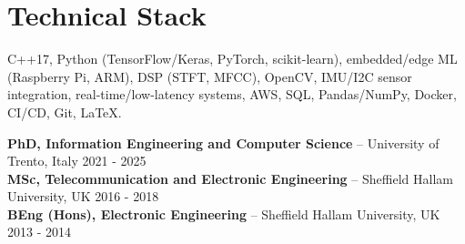 \documentclass[11pt]{article}
\begin{document}
\section*{Technical Stack}
C++17, Python (TensorFlow/Keras, PyTorch, scikit-learn), embedded/edge ML (Raspberry Pi, ARM), DSP (STFT, MFCC), OpenCV, IMU/I2C sensor integration, real-time/low-latency systems, AWS, SQL, Pandas/NumPy, Docker, CI/CD, Git, LaTeX.

\textbf{PhD, Information Engineering and Computer Science} -- University of Trento, Italy \hfill 2021 - 2025 \\
\textbf{MSc, Telecommunication and Electronic Engineering} -- Sheffield Hallam University, UK \hfill 2016 - 2018 \\
\textbf{BEng (Hons), Electronic Engineering} -- Sheffield Hallam University, UK \hfill 2013 - 2014
\end{document}
